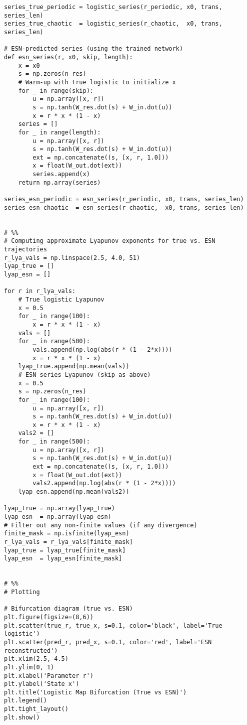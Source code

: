 \begin{verbatim}
series_true_periodic = logistic_series(r_periodic, x0, trans, series_len)
series_true_chaotic  = logistic_series(r_chaotic,  x0, trans, series_len)

# ESN-predicted series (using the trained network)
def esn_series(r, x0, skip, length):
    x = x0
    s = np.zeros(n_res)
    # Warm-up with true logistic to initialize x
    for _ in range(skip):
        u = np.array([x, r])
        s = np.tanh(W_res.dot(s) + W_in.dot(u))
        x = r * x * (1 - x)
    series = []
    for _ in range(length):
        u = np.array([x, r])
        s = np.tanh(W_res.dot(s) + W_in.dot(u))
        ext = np.concatenate((s, [x, r, 1.0]))
        x = float(W_out.dot(ext))
        series.append(x)
    return np.array(series)

series_esn_periodic = esn_series(r_periodic, x0, trans, series_len)
series_esn_chaotic  = esn_series(r_chaotic,  x0, trans, series_len)


# %%
# Computing approximate Lyapunov exponents for true vs. ESN trajectories
r_lya_vals = np.linspace(2.5, 4.0, 51)
lyap_true = []
lyap_esn = []

for r in r_lya_vals:
    # True logistic Lyapunov
    x = 0.5
    for _ in range(100):
        x = r * x * (1 - x)
    vals = []
    for _ in range(500):
        vals.append(np.log(abs(r * (1 - 2*x))))
        x = r * x * (1 - x)
    lyap_true.append(np.mean(vals))
    # ESN series Lyapunov (skip as above)
    x = 0.5
    s = np.zeros(n_res)
    for _ in range(100):
        u = np.array([x, r])
        s = np.tanh(W_res.dot(s) + W_in.dot(u))
        x = r * x * (1 - x)
    vals2 = []
    for _ in range(500):
        u = np.array([x, r])
        s = np.tanh(W_res.dot(s) + W_in.dot(u))
        ext = np.concatenate((s, [x, r, 1.0]))
        x = float(W_out.dot(ext))
        vals2.append(np.log(abs(r * (1 - 2*x))))
    lyap_esn.append(np.mean(vals2))

lyap_true = np.array(lyap_true)
lyap_esn  = np.array(lyap_esn)
# Filter out any non-finite values (if any divergence)
finite_mask = np.isfinite(lyap_esn)
r_lya_vals = r_lya_vals[finite_mask]
lyap_true = lyap_true[finite_mask]
lyap_esn  = lyap_esn[finite_mask]


# %%
# Plotting

# Bifurcation diagram (true vs. ESN)
plt.figure(figsize=(8,6))
plt.scatter(true_r, true_x, s=0.1, color='black', label='True logistic')
plt.scatter(pred_r, pred_x, s=0.1, color='red', label='ESN reconstructed')
plt.xlim(2.5, 4.5)
plt.ylim(0, 1)
plt.xlabel('Parameter r')
plt.ylabel('State x')
plt.title('Logistic Map Bifurcation (True vs ESN)')
plt.legend()
plt.tight_layout()
plt.show()


\end{verbatim}
